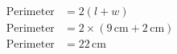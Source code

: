 \documentclass[12pt]{article}
\begin{document}
\hfill
\begin{minipage}{.4\textwidth}
  \begin{align*}
  \text{Perimeter} &= 2(l+w) \\
  \text{Perimeter} &= 2 \times (9 \,\text{cm} + 2 \,\text{cm}) \\
  \text{Perimeter} &= 22 \,\text{cm}
  \end{align*}
\end{minipage}
\par\vspace{1cm}
\end{document}
